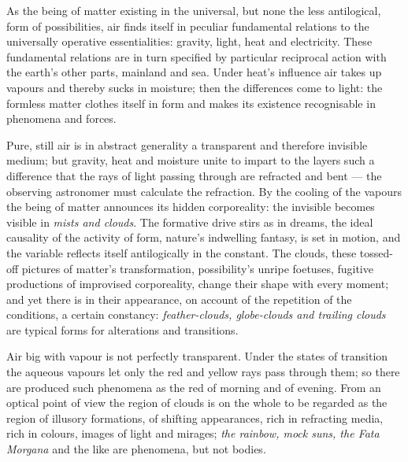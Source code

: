 \documentclass[12pt,a4paper]{book}
\begin{document}
As the being of matter existing in the universal, but none the less antilogical, form of possibilities, air finds itself
in peculiar fundamental relations to the universally operative essentialities: gravity, light, heat and electricity.
These fundamental relations are in turn specified by particular reciprocal action with the earth's other parts, mainland
and sea. Under heat's influence air takes up vapours and thereby sucks in moisture; then the differences come to light:
the formless matter clothes itself in form and makes its existence recognisable in phenomena and forces.

Pure, still air is in abstract generality a transparent and therefore invisible medium; but gravity, heat and moisture
unite to impart to the layers such a difference that the rays of light passing through are refracted and bent --- the
observing astronomer must calculate the refraction. By the cooling of the vapours the being of matter announces its
hidden corporeality: the invisible becomes visible in \emph{mists and clouds}. The formative drive stirs as in dreams,
the ideal causality of the activity of form, nature's indwelling fantasy, is set in motion, and the variable reflects
itself antilogically in the constant. The clouds, these tossed-off pictures of matter's transformation, possibility's
unripe
foetuses, fugitive productions of improvised corporeality, change their shape with every moment; and yet there is in
their appearance, on account of the repetition of the conditions, a certain constancy:
\emph{feather-clouds, globe-clouds and trailing clouds} are typical forms for alterations and transitions.

Air big with vapour is not perfectly transparent. Under the states of transition the aqueous vapours let only the red and
yellow rays pass through them; so there are produced such phenomena as the red of morning and of evening. From an optical
point of view the region of clouds is on the whole to be regarded as the region of illusory formations, of shifting
appearances, rich in refracting media, rich in colours, images of light and mirages; \emph{the rainbow, mock suns, the
Fata Morgana} and the like are phenomena, but not bodies.
\end{document}
